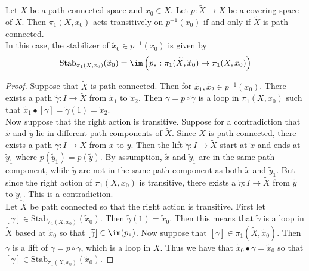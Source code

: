 \documentclass[a4paper]{article}
\begin{document}
\begin{prp}{}{} Let $X$ be a path connected space and $x_0\in X$. Let $p:\widetilde{X}\to X$ be a covering space of $X$. Then $\pi_1(X,x_0)$ acts transitively on $p^{-1}(x_0)$ if and only if $\widetilde{X}$ is path connected. \\

In this case, the stabilizer of $\widetilde{x}_0\in p^{-1}(x_0)$ is given by $$\text{Stab}_{\pi_1(X,x_0)}(\widetilde{x}_0)=\im\left(p_\ast:\pi_1(\widetilde{X},\widetilde{x}_0)\to\pi_1(X,x_0)\right)$$ 
\begin{proof}
Suppose that $\widetilde{X}$ is path connected. Then for $\widetilde{x}_1,\widetilde{x}_2\in p^{-1}(x_0)$. There exists a path $\widetilde{\gamma}:I\to\widetilde{X}$ from $\widetilde{x}_1$ to $\widetilde{x}_2$. Then $\gamma=p\circ\widetilde{\gamma}$ is a loop in $\pi_1(X,x_0)$ such that $\widetilde{x}_1\bullet[\gamma]=\widetilde{\gamma}(1)=\widetilde{x}_2$. \\

Now suppose that the right action is transitive. Suppose for a contradiction that $\widetilde{x}$ and $\widetilde{y}$ lie in different path components of $\widetilde{X}$. Since $X$ is path connected, there exists a path $\gamma:I\to X$ from $x$ to $y$. Then the lift $\widetilde{\gamma}:I\to\widetilde{X}$ start at $\widetilde{x}$ and ends at $\widetilde{y}_1$ where $p(\widetilde{y}_1)=p(\widetilde{y})$. By assumption, $\widetilde{x}$ and $\widetilde{y}_1$ are in the same path component, while $\widetilde{y}$ are not in the same path component as both $\widetilde{x}$ and $\widetilde{y}_1$. But since the right action of $\pi_1(X,x_0)$ is transitive, there exists a $\widetilde{\eta}:I\to\widetilde{X}$ from $\widetilde{y}$ to $\widetilde{y}_1$. This is a contradiction. \\

Let $\widetilde{X}$ be path connected so that the right action is transitive. First let $[\gamma]\in\text{Stab}_{\pi_1(X,x_0)}(\widetilde{x}_0)$. Then $\widetilde{\gamma}(1)=\widetilde{x}_0$. Then this means that $\widetilde{\gamma}$ is a loop in $\widetilde{X}$ based at $\widetilde{x}_0$ so that $[\widetilde{\gamma}]\in\im(p_\ast)$. Now suppose that $[\widetilde{\gamma}]\in\pi_1(\widetilde{X},\widetilde{x}_0)$. Then $\widetilde{\gamma}$ is a lift of $\gamma=p\circ\widetilde{\gamma}$, which is a loop in $X$. Thus we have that $\widetilde{x}_0\bullet\gamma=\widetilde{x}_0$ so that $[\gamma]\in\text{Stab}_{\pi_1(X,x_0)}(\widetilde{x}_0)$. 
\end{proof}
\end{prp}
\end{document}
